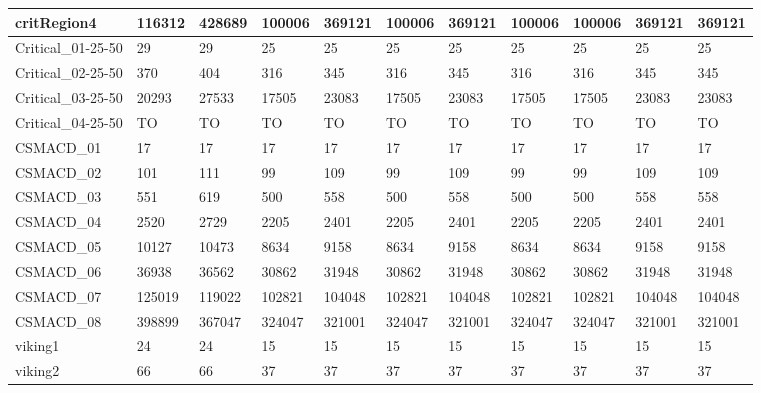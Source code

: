 \begin{table}
\begin{adjustbox}{max totalheight=\textheight}
\begin{tabular}{|l|llllllllll|}
    critRegion4        & 116312   & 428689   & 100006   & 369121   & 100006   & 369121   & 100006   & 100006   & 369121   & 369121   \\ \hline
    Critical\_01-25-50 & 29       & 29       & 25       & 25       & 25       & 25       & 25       & 25       & 25       & 25       \\
    Critical\_02-25-50 & 370      & 404      & 316      & 345      & 316      & 345      & 316      & 316      & 345      & 345      \\
    Critical\_03-25-50 & 20293    & 27533    & 17505    & 23083    & 17505    & 23083    & 17505    & 17505    & 23083    & 23083    \\
    Critical\_04-25-50 & TO       & TO       & TO       & TO       & TO       & TO       & TO       & TO       & TO       & TO       \\ \hline
    CSMACD\_01         & 17       & 17       & 17       & 17       & 17       & 17       & 17       & 17       & 17       & 17       \\
    CSMACD\_02         & 101      & 111      & 99       & 109      & 99       & 109      & 99       & 99       & 109      & 109      \\
    CSMACD\_03         & 551      & 619      & 500      & 558      & 500      & 558      & 500      & 500      & 558      & 558      \\
    CSMACD\_04         & 2520     & 2729     & 2205     & 2401     & 2205     & 2401     & 2205     & 2205     & 2401     & 2401     \\
    CSMACD\_05         & 10127    & 10473    & 8634     & 9158     & 8634     & 9158     & 8634     & 8634     & 9158     & 9158     \\
    CSMACD\_06         & 36938    & 36562    & 30862    & 31948    & 30862    & 31948    & 30862    & 30862    & 31948    & 31948    \\
    CSMACD\_07         & 125019   & 119022   & 102821   & 104048   & 102821   & 104048   & 102821   & 102821   & 104048   & 104048   \\
    CSMACD\_08         & 398899   & 367047   & 324047   & 321001   & 324047   & 321001   & 324047   & 324047   & 321001   & 321001   \\ \hline
    viking1            & 24       & 24       & 15       & 15       & 15       & 15       & 15       & 15       & 15       & 15       \\
    viking2            & 66       & 66       & 37       & 37       & 37       & 37       & 37       & 37       & 37       & 37       \\

\end{tabular}
\end{adjustbox}
\end{table}
